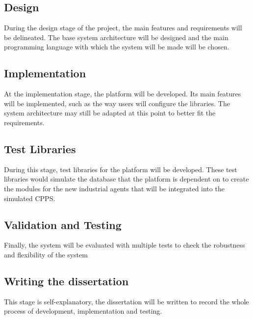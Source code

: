\subsection{Design}

During the design stage of the project, the main features and requirements will be delineated. The base system architecture will be designed and the main programming language with which the system will be made will be chosen.

\subsection{Implementation}

At the implementation stage, the platform will be developed. Its main features will be implemented, such as the way users will configure the libraries. The system architecture may still be adapted at this point to better fit the requirements.

\subsection{Test Libraries}

During this stage, test libraries for the platform will be developed. These test libraries would simulate the database that the platform is dependent on to create the modules for the new industrial agents that will be integrated into the simulated \gls{CPPS}. 

\subsection{Validation and Testing}

Finally, the system will be evaluated with multiple tests to check the robustness and flexibility of the system

\subsection{Writing the dissertation}

This stage is self-explanatory, the dissertation will be written to record the whole process of development, implementation and testing.\\